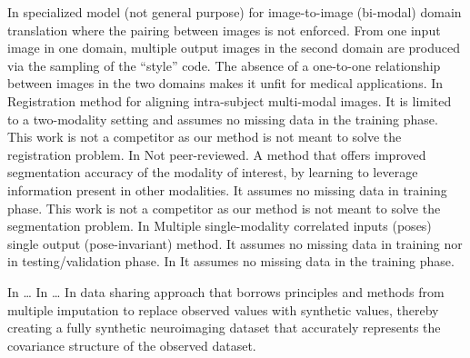 In \cite{Huang2018}
specialized model (not general purpose) for image-to-image (bi-modal) domain translation where the pairing between images is not enforced.
From one input image in one domain, multiple output images in the second domain are produced via the sampling of the “style” code.
The absence of a one-to-one relationship between images in the two domains makes it unfit for medical applications.
In \cite{Qin2019}
Registration method for aligning intra-subject multi-modal images.
It is limited to a two-modality setting and assumes no missing data in the training phase.
This work is not a competitor as our method is not meant to solve the registration problem.
In \cite{Chartsias2019}
Not peer-reviewed.
A method that offers improved segmentation accuracy of the modality of interest, by learning to leverage information present in other modalities.
It assumes no missing data in training phase.
This work is not a competitor as our method is not meant to solve the segmentation problem.
In \cite{Tran2017}
Multiple single-modality correlated inputs (poses) single output (pose-invariant) method.
It assumes no missing data in training nor in testing/validation phase.
In \cite{Yang2020}
It assumes no missing data in the training phase.

In \citep{Lorenzi2019} \ldots
In \citep{Wei2020} \ldots
In \citep{Vaden2020} data sharing approach that borrows principles and methods from multiple imputation to replace observed values with synthetic values, thereby creating a fully synthetic neuroimaging dataset that accurately represents the covariance structure of the observed dataset. 
